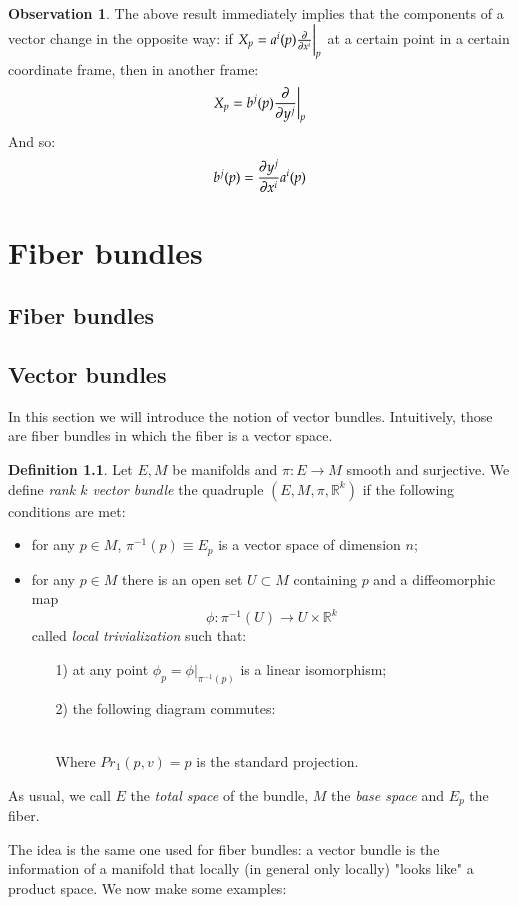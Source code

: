 \documentclass[12pt,a4paper]{report}
\theoremstyle{definition}
\newtheorem{Def}{Definition}[chapter]
\theoremstyle{Theorem}
\theoremstyle{break}
\theoremstyle{definition}
\newtheorem{Obs}[Def]{Observation}
\begin{document}
			\begin{Obs}
				The above result immediately implies that the components of a vector change in the opposite way: if $X_p=a^i(p){\partial\over \partial x^i}\bigg|_p$ at a certain point in a certain coordinate frame, then in another frame:
				$$X_p=b^j(p){\partial\over \partial y^j}\bigg|_p$$
				And so:
				$$b^j(p)={\partial y^j\over \partial x^i}a^i(p)$$
			\end{Obs}
	\chapter{Fiber bundles}
		\section{Fiber bundles}
		\section{Vector bundles}
			In this section we will introduce the notion of vector bundles. Intuitively, those are fiber bundles in which the fiber is a vector space.
			\begin{Def}
				Let $E,M$ be manifolds and $\pi:E\rightarrow M$ smooth and surjective. We define \textit{rank $k$ vector bundle} the quadruple $(E,M,\pi,\mathbb{R}^k)$ if the following conditions are met:
				\begin{itemize}
					\item for any $p\in M$, $\pi^{-1}(p)\equiv E_p$ is a vector space of dimension $n$;
					\item for any $p\in M$ there is an open set $U\subset M$ containing $p$ and a diffeomorphic map 
					$$\phi:\pi^{-1}(U)\longrightarrow U\times \mathbb{R}^k$$
					called \textit{local trivialization} such that:
					\begin{itemize}
						\item[1)] at any point $\phi_p=\phi\big|_{\pi^{-1}(p)}$ is a linear isomorphism;
						\item[2)] the following diagram commutes:\\\\
						\begin{center}
						\end{center}
						Where $Pr_1(p,v)=p$ is the standard projection. 
					\end{itemize}
				\end{itemize}
				As usual, we call $E$ the \textit{total space} of the bundle, $M$ the  \textit{base space} and $E_p$ the fiber.
			\end{Def}
			The idea is the same one used for fiber bundles: a vector bundle is the information of a manifold that locally (in general only locally) "looks like" a product space. We now make some examples:
\end{document}
